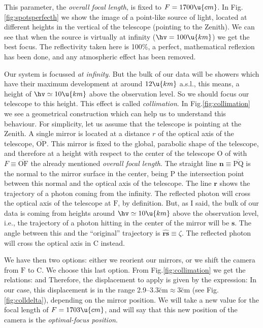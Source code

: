 This parameter, the \emph{overall focal length}, is fixed to
$F=1700\u{cm}$. In Fig.\ref{fig:spotsperfecth} we show the image of a
point-like source of light, located at different heights \hv in the
vertical of the telescope (pointing to the Zenith). We can see that
when the source is virtually at infinity ($\hv=100\u{km}$) we get the
best focus. The reflectivity taken here is 100\%, a perfect,
mathematical reflexion has been done, and any atmospheric effect has
been removed.

\collimationfig

Our system is focussed \emph{at infinity}. But the bulk of our data
will be showers which have their maximum development at around
$12\u{km}$ a.s.l., this means, a height of $\hv\simeq 10\u{km}$ above
the observation level.  So we should focus our telescope to this
height.  This effect is called \emph{collimation}. In
Fig.\ref{fig:collimation} we see a geometrical construction which can
help us to understand this behaviour.  For simplicity, let us assume
that the telescope is pointing at the Zenith. A single mirror is
located at a distance $r$ of the optical axis of the telescope,
$\overline{\mathrm{OP}}$. This mirror is fixed to the global,
parabolic shape of the telescope, and therefore at a height with
respect to the center of the telescope $\mathrm{O}$ of
%
\zparabeq
%
with $F\equiv\overline{\mathrm{OF}}$ the already mentioned
\emph{overall focal length}. The straight line
$\mathbf{n}\equiv\overline{\mathrm{PQ}}$ is the normal to the mirror
surface in the center, being $\mathrm{P}$ the intersection point
between this normal and the optical axis of the telescope. The line
$\mathbf{r}$ shows the trajectory of a photon coming from the
infinity. The reflected photon will cross the optical axis of the
telescope at $\mathrm{F}$, by definition. But, as I said, the bulk of
our data is coming from heights around $\hv\simeq 10\u{km}$ above the
observation level, i.e., the trajectory of a photon hitting in the
center of the mirror will be $\mathbf{s}$. The angle between this and
the ``original'' trajectory is $\widehat{\mathbf{rs}}\equiv\zeta$. The
reflected photon will cross the optical axis in $\mathrm{C}$ instead.

We have then two options: either we reorient our mirrors, or we shift
the camera from $\mathrm{F}$ to $\mathrm{C}$. We choose this last
option. From Fig.\ref{fig:collimation} we get the relations:
%
\relationsAeq
%
and
%
\relationsBeq
%
Therefore, the displacement to apply is given by the expression:
%
\collimationeq
%
In our case, this displacement is in the range
2.9--3.3\u{cm}$\approx$3\u{cm} (see Fig.\ref{fig:colldelta}),
depending on the mirror position. We will take a new value for the
focal length of $F=1703\u{cm}$, and will say that this new position of
the camera is the \emph{optimal-focus position}.

